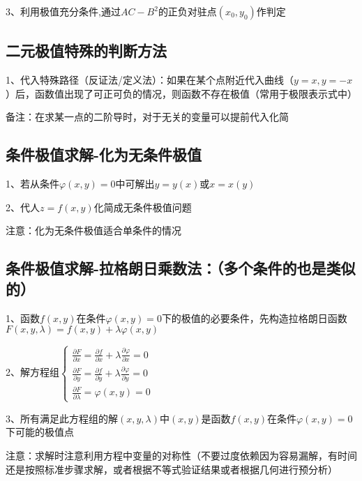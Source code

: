 3、利用极值充分条件,通过$A C-B^{2}$的正负对驻点$\left(x_{0}, y_{0}\right)$作判定



\subsection{二元极值特殊的判断方法}

1、代入特殊路径（反证法/定义法）：如果在某个点附近代入曲线（$y=x,y=-x$）后，函数值出现了可正可负的情况，则函数不存在极值（常用于极限表示式中）

备注：在求某一点的二阶导时，对于无关的变量可以提前代入化简



\subsection{条件极值求解-化为无条件极值}

1、若从条件$\varphi(x, y)=0$中可解出$y=y(x)$或$x=x(y)$

2、代人$z=f(x, y)$化简成无条件极值问题

注意：化为无条件极值适合单条件的情况



\subsection{条件极值求解-拉格朗日乘数法：（多个条件的也是类似的）}

1、函数$f(x, y)$在条件$\varphi(x, y)=0$下的极值的必要条件，先构造拉格朗日函数$F(x, y, \lambda)=f(x, y)+\lambda \varphi(x, y)$

2、解方程组$\left\{\begin{array}{l} \frac{\partial F}{\partial x}=\frac{\partial f}{\partial x}+\lambda \frac{\partial \varphi}{\partial x}=0 \\ \frac{\partial F}{\partial y}=\frac{\partial f}{\partial y}+\lambda \frac{\partial \varphi}{\partial y}=0 \\ \frac{\partial F}{\partial \lambda}=\varphi(x, y)=0 \end{array}\right.$

3、所有满足此方程组的解$(x, y, \lambda)$中$(x, y)$是函数$f(x, y)$在条件$\varphi(x, y)=0$下可能的极值点

注意：求解时注意利用方程中变量的对称性（不要过度依赖因为容易漏解，有时间还是按照标准步骤求解，或者根据不等式验证结果或者根据几何进行预分析）

